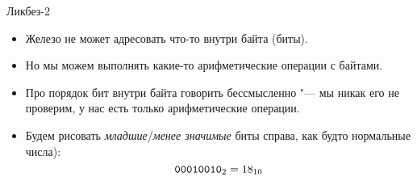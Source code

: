 \begin{frame}{Ликбез-2}
	\begin{itemize}
		\item
			Железо не может адресовать что-то внутри байта (биты).
		\item
			Но мы можем выполнять какие-то арифметические операции с байтами.
		\item
			Про порядок бит внутри байта говорить бессмысленно "--- мы никак его не проверим, у нас есть только арифметические операции.
		\item
			Будем рисовать \textit{младшие}/\textit{менее значимые} биты справа, как будто нормальные числа):
			\[ \t{0001 0010}_2 = 18_{10} \]
	\end{itemize}
\end{frame}
